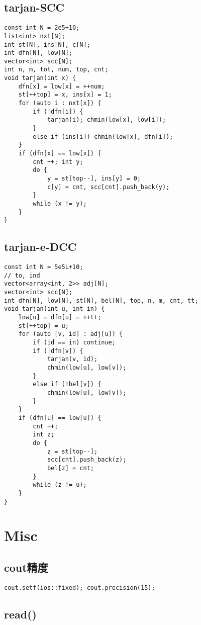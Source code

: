 \documentclass[a4paper,landscape,twocolumn]{ctexart}
\begin{document}
\subsection{tarjan-SCC}

\begin{lstlisting}
const int N = 2e5+10;
list<int> nxt[N];
int st[N], ins[N], c[N];
int dfn[N], low[N];
vector<int> scc[N];
int n, m, tot, num, top, cnt;
void tarjan(int x) {
	dfn[x] = low[x] = ++num;
	st[++top] = x, ins[x] = 1;
	for (auto i : nxt[x]) {
		if (!dfn[i]) {
			tarjan(i); chmin(low[x], low[i]);
		}
		else if (ins[i]) chmin(low[x], dfn[i]);
	}
	if (dfn[x] == low[x]) {
		cnt ++; int y;
		do {
			y = st[top--], ins[y] = 0;
			c[y] = cnt, scc[cnt].push_back(y);
		}
		while (x != y);
	}
}
\end{lstlisting}

\subsection{tarjan-e-DCC}

\begin{lstlisting}
const int N = 5e5L+10;
// to, ind
vector<array<int, 2>> adj[N];
vector<int> scc[N];
int dfn[N], low[N], st[N], bel[N], top, n, m, cnt, tt;
void tarjan(int u, int in) {
	low[u] = dfn[u] = ++tt;
	st[++top] = u;
	for (auto [v, id] : adj[u]) {
		if (id == in) continue;
		if (!dfn[v]) {
			tarjan(v, id);
			chmin(low[u], low[v]);
		}
		else if (!bel[v]) {
			chmin(low[u], low[v]);
		}
	}
	if (dfn[u] == low[u]) {
		cnt ++;
		int z;
		do {
			z = st[top--];
			scc[cnt].push_back(z);
			bel[z] = cnt;
		}
		while (z != u);
	}
}
\end{lstlisting}

\section{Misc}

\subsection{cout精度}

\begin{lstlisting}
cout.setf(ios::fixed); cout.precision(15);
\end{lstlisting}

\subsection{read()}
\end{document}
